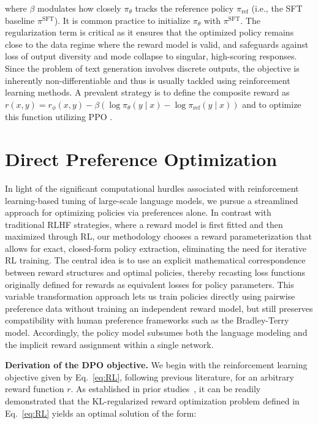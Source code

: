 where $\beta$ modulates how closely $\pi_{\theta}$ tracks the reference policy $\pi_\text{ref}$ (i.e., the SFT baseline $\pi^\text{SFT}$). It is common practice to initialize $\pi_{\theta}$ with $\pi^\text{SFT}$. The regularization term is critical as it ensures that the optimized policy remains close to the data regime where the reward model is valid, and safeguards against loss of output diversity and mode collapse to singular, high-scoring responses. Since the problem of text generation involves discrete outputs, the objective is inherently non-differentiable and thus is usually tackled using reinforcement learning methods. A prevalent strategy \citep{ziegler2020finetuning, stiennon2022learning, bai2022training, ouyang2022training} is to define the composite reward as ${r(x, y) = r_{\phi}(x, y) -\beta (\log \pi_{\theta}(y\mid x) - \log \pi_\text{ref}(y\mid x))}$ and to optimize this function utilizing PPO \cite{schulman2017proximal}.

\section{Direct Preference Optimization}\label{sec:DPO}

In light of the significant computational hurdles associated with reinforcement learning-based tuning of large-scale language models, we pursue a streamlined approach for optimizing policies via preferences alone. In contrast with traditional RLHF strategies, where a reward model is first fitted and then maximized through RL, our methodology chooses a reward parameterization that allows for exact, closed-form policy extraction, eliminating the need for iterative RL training. The central idea is to use an explicit mathematical correspondence between reward structures and optimal policies, thereby recasting loss functions originally defined for rewards as equivalent losses for policy parameters. This variable transformation approach lets us train policies directly using pairwise preference data without training an independent reward model, but still preserves compatibility with human preference frameworks such as the Bradley-Terry model. Accordingly, the policy model subsumes both the language modeling and the implicit reward assignment within a single network.

\textbf{Derivation of the DPO objective.} We begin with the reinforcement learning objective given by Eq.~\ref{eq:RL}, following previous literature, for an arbitrary reward function $r$. As established in prior studies~\citep{peters2007reinforcement, peng2019advantage, korbak2022reinforcement, go2023aligning}, it can be readily demonstrated that the KL-regularized reward optimization problem defined in Eq.~\ref{eq:RL} yields an optimal solution of the form:

